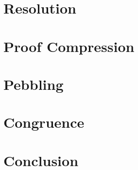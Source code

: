 \documentclass[a4paper,11pt,twoside]{memoir}
\begin{document}


\chapter{Resolution}
\label{ch:resolution}



\chapter{Proof Compression}
\label{ch:proofcomp}



\chapter{Pebbling}
\label{ch:pebbling}



\chapter{Congruence}
\label{ch:congruence}



\chapter{Conclusion}
\label{ch:conclusion}




%


%


\appendix



\end{document}
